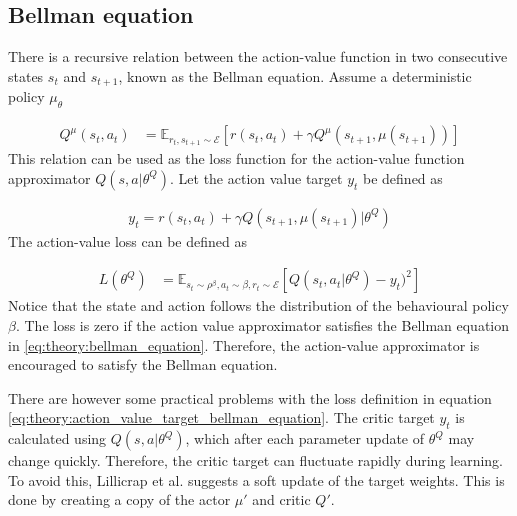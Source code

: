 \documentclass[class=book, crop=false]{standalone}
\begin{document}
\subsection{Bellman equation}
There is a recursive relation between the action-value function in two consecutive states $s_{t}$ and $s_{t+1}$, known as the Bellman equation. Assume a deterministic policy $\mu_{\theta}$

\begin{equation}
   \begin{aligned}\label{eq:theory:bellman_equation}
Q^{\mu}(s_{t},a_{t}) 
&= \mathbb{E}_{r_{t},s_{t+1} \sim \mathcal{E}}
[r(s_{t},a_{t}) +\gamma Q^{\mu}(s_{t+1},\mu(s_{t+1}))]
\end{aligned} 
\end{equation}
This relation can be used as the loss function for the action-value function approximator $Q(s,a|\theta^{Q})$. Let the action value target $y_{t} $ be defined as 

\begin{equation}
   \begin{aligned}\label{eq:theory:action_value_target_bellman_equation}
y_{t} = r(s_{t},a_{t}) + \gamma Q(s_{t+1},\mu(s_{t+1})|\theta^{Q})
\end{aligned} 
\end{equation}
The action-value loss can be defined as 

\begin{equation}
   \begin{aligned}\label{eq:theory:action_value_loss_bellman_equation}
L(\theta^{Q}) 
&= \mathbb{E}_
{s_{t}\sim\rho^{\beta},a_{t} \sim \beta, r_{t} \sim \mathcal{E}}
[Q(s_{t},a_{t}|\theta^{Q})- y_{t})^{2}]
\end{aligned} 
\end{equation}
Notice that the state and action follows the distribution of the behavioural policy $\beta$. The loss is zero if the action value approximator satisfies the Bellman equation in \eqref{eq:theory:bellman_equation}. Therefore, the action-value approximator is encouraged to satisfy the Bellman equation.

There are however some practical problems with the loss definition in equation \eqref{eq:theory:action_value_target_bellman_equation}. The critic target $y_{t}$ is calculated using $Q(s,a|\theta^{Q})$, which after each parameter update of $\theta^{Q}$ may change quickly. Therefore, the critic target can fluctuate rapidly during learning. To avoid this, Lillicrap et al. suggests a soft update of the target weights\cite{DBLP:journals/corr/LillicrapHPHETS15}. This is done by creating a copy of the actor $\mu'$ and critic $Q'$.
\end{document}

